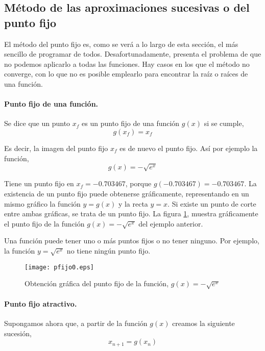 \subsection{Método de las aproximaciones sucesivas o del punto fijo}\label{pfijo}

El método del punto fijo es, como se verá a lo largo de esta sección, el más sencillo de programar de todos. Desafortunadamente, presenta el problema de que no podemos aplicarlo a todas las funciones. Hay casos en los que el método no converge, con lo que no es posible emplearlo para encontrar la raíz o raíces de una función.
 
\paragraph{Punto fijo de una función.} Se dice que un punto $x_f$ es un punto fijo de una función $g(x)$ si se cumple,
\begin{equation*}
g(x_f)=x_f
\end{equation*}

Es decir, la imagen del punto fijo $x_f$ es de nuevo el punto fijo. Así por ejemplo la función,
\begin{equation*}
g(x)=-\sqrt{e^x}
\end{equation*}

Tiene un punto fijo en $x_f=-0.703467$, porque $g(-0.703467)=-0.703467$. La existencia de un punto fijo puede obtenerse gráficamente, representando en un mismo gráfico la función $y=g(x)$ y la recta $y=x$. Si existe un punto de corte entre ambas gráficas, se trata de un punto fijo.  La figura \ref{fig:pfijo0}, muestra gráficamente el punto fijo de la función $g(x)=-\sqrt{e^x}$ del ejemplo anterior.

Una función puede tener uno o más puntos fijos o no tener ninguno. Por ejemplo, la función $y=\sqrt{e^x}$ no tiene ningún punto fijo.


\begin{figure}[h]
\texttt{[image: pfijo0.eps]}
\caption{Obtención gráfica del punto fijo de la función, $g(x)=-\sqrt{e^x}$}
\label{fig:pfijo0}
\end{figure}

\paragraph{Punto fijo atractivo.} Supongamos ahora que, a partir de la función $g(x)$ creamos la siguiente sucesión,
\begin{equation*}
x_{n+1}=g(x_n)
\end{equation*}

